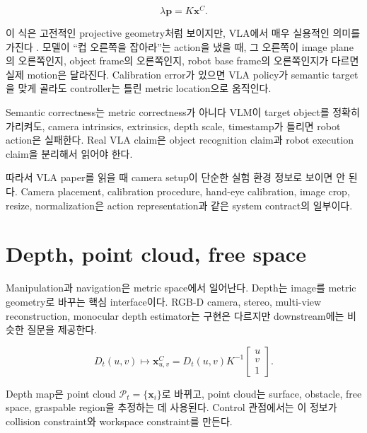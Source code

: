 \begin{equation}
  \lambda \bm{p} = K \bm{x}^{C}.
  \label{eq:camera-projection}
\end{equation}

이 식은 고전적인 projective geometry처럼 보이지만, VLA에서 매우 실용적인 의미를 가진다 \cite{hartley2004}. 모델이 ``컵 오른쪽을 잡아라''는 action을 냈을 때, 그 오른쪽이 image plane의 오른쪽인지, object frame의 오른쪽인지, robot base frame의 오른쪽인지가 다르면 실제 motion은 달라진다. Calibration error가 있으면 VLA policy가 semantic target을 맞게 골라도 controller는 틀린 metric location으로 움직인다.

\begin{warningbox}{Semantic correctness는 metric correctness가 아니다}
VLM이 target object를 정확히 가리켜도, camera intrinsics, extrinsics, depth scale, timestamp가 틀리면 robot action은 실패한다. Real VLA claim은 object recognition claim과 robot execution claim을 분리해서 읽어야 한다.
\end{warningbox}

따라서 VLA paper를 읽을 때 camera setup이 단순한 실험 환경 정보로 보이면 안 된다. Camera placement, calibration procedure, hand-eye calibration, image crop, resize, normalization은 action representation과 같은 system contract의 일부이다.

\section{Depth, point cloud, free space}

Manipulation과 navigation은 metric space에서 일어난다. Depth는 image를 metric geometry로 바꾸는 핵심 interface이다. RGB-D camera, stereo, multi-view reconstruction, monocular depth estimator는 구현은 다르지만 downstream에는 비슷한 질문을 제공한다.

\begin{equation}
  D_t(u,v) \mapsto \bm{x}^{C}_{u,v}
  =
  D_t(u,v)K^{-1}
  \begin{bmatrix}
  u\\v\\1
  \end{bmatrix}.
  \label{eq:depth-unprojection}
\end{equation}

Depth map은 point cloud $\mathcal{P}_t=\{\bm{x}_i\}$로 바뀌고, point cloud는 surface, obstacle, free space, graspable region을 추정하는 데 사용된다. Control 관점에서는 이 정보가 collision constraint와 workspace constraint를 만든다.

